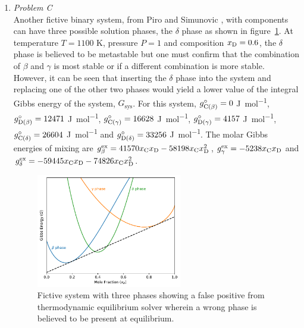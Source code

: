 \begin{enumerate}
	\item	\emph{Problem C}\\
		Another fictive binary system, from Piro and Simunovic \cite{Piro16}, with components  can have three possible solution phases, the $\delta$ phase as shown in figure~\ref{fig:testC}. At  temperature  $T = 1100$ \si{\kelvin}, pressure $P=1$ \si{\atmosphere} and composition $x_{\ce{D}} = 0.6$, the $\delta$ phase is believed to be metastable but one must confirm that the combination of $\beta$ and $\gamma$ is most stable or if a different combination is more stable. However, it can be seen that inserting the $\delta$ phase into the system and replacing one of the other two phases would yield a lower value of the integral Gibbs energy of the system, $G_\text{sys}$. For this system, $g_{\ce{C}(\beta)}^\circ = 0$ \si{\joule \per \mole}, $g_{\ce{D}(\beta)}^\circ = 12471$ \si{\joule \per \mole}, $g_{\ce{C}(\gamma)}^\circ = 16628$ \si{\joule \per \mole}, $g_{\ce{D}(\gamma)}^\circ = 4157$ \si{\joule \per \mole}, $g_{\ce{C}(\delta)}^\circ = 26604$ \si{\joule \per \mole} and $g_{\ce{D}(\delta)}^\circ = 33256$ \si{\joule \per \mole}. The molar Gibbs energies of mixing are $g_{\beta}^\text{ex} = 41570 x_{\ce{C}} x_{\ce{D}} - 58198 x_{\ce{C}}x_{\ce{D}}^2$, $g_{\gamma}^\text{ex} = -5238 x_{\ce{C}} x_{\ce{D}}$ and $g_{\delta}^\text{ex} = -59445 x_{\ce{C}} x_{\ce{D}} - 74826 x_{\ce{C}}x_{\ce{D}}^2$.
		\begin{figure}[htbp]
			\centering
			\includegraphics[width=0.6\textwidth]{figures/chapter-6/System_CD.pdf}
			\caption[Global optimisation test problem C: Fictive system with three phases showing a false positive from thermodynamic equilibrium solver wherein a wrong phase is believed to be present at equilibrium.]{Fictive system with three phases showing a false positive from thermodynamic equilibrium solver wherein a wrong phase is believed to be present at equilibrium.}
			\label{fig:testC}
		\end{figure}
	

\end{enumerate}
